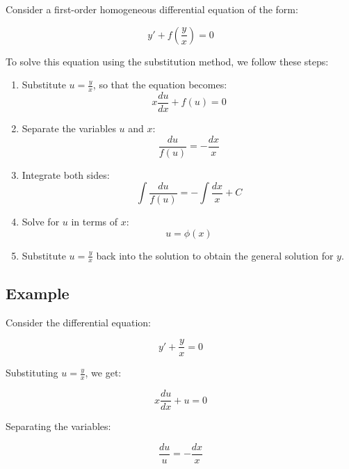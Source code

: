 \documentclass[a4paper,12pt]{article}
\begin{document}
Consider a first-order homogeneous differential equation of the form:

\begin{equation*}
y' + f\left(\frac{y}{x}\right) = 0
\end{equation*}

To solve this equation using the substitution method, we follow these steps:

\begin{enumerate}
    \item Substitute $u = \frac{y}{x}$, so that the equation becomes:
    \begin{equation*}
        x \frac{du}{dx} + f(u) = 0
    \end{equation*}
    \item Separate the variables $u$ and $x$:
    \begin{equation*}
        \frac{du}{f(u)} = -\frac{dx}{x}
    \end{equation*}
    \item Integrate both sides:
    \begin{equation*}
        \int \frac{du}{f(u)} = -\int \frac{dx}{x} + C
    \end{equation*}
    \item Solve for $u$ in terms of $x$:
    \begin{equation*}
        u = \phi(x)
    \end{equation*}
    \item Substitute $u = \frac{y}{x}$ back into the solution to obtain the general solution for $y$.
\end{enumerate}

\subsection*{Example}

Consider the differential equation:

\begin{equation*}
    y' + \frac{y}{x} = 0
\end{equation*}

Substituting $u = \frac{y}{x}$, we get:

\begin{equation*}
    x \frac{du}{dx} + u = 0
\end{equation*}

Separating the variables:

\begin{equation*}
    \frac{du}{u} = -\frac{dx}{x}
\end{equation*}
\end{document}
